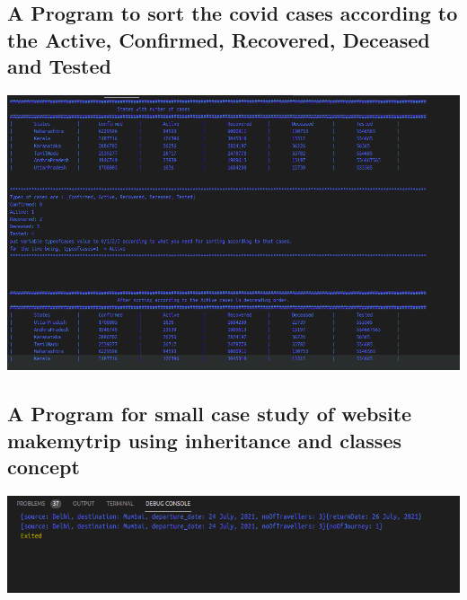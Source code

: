 \subsection{A Program to sort the covid cases according to the Active, Confirmed, Recovered, Deceased and Tested}

\includegraphics[width=16cm]{dart/covidcases.png}\\[0.5cm]
\subsection{A Program for small case study of website makemytrip using inheritance and classes concept}

\includegraphics[width=16cm]{dart/makemytrip.png}\\[0.5cm]